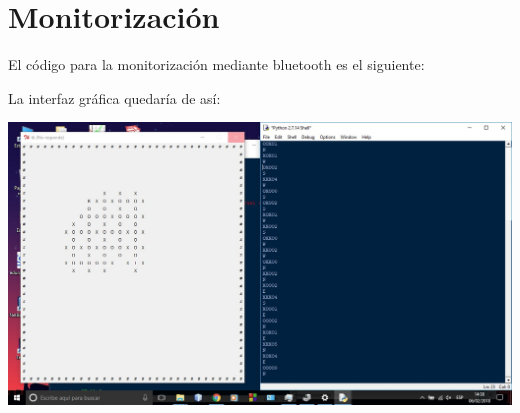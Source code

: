 \section{Monitorización}
\hypertarget{Monitorizacion}{}
El código para la monitorización mediante bluetooth es el siguiente:


\newpage
La interfaz gráfica quedaría de así:
\begin{center}
	\includegraphics[scale=0.35]{Interfaz.jpeg}
\end{center}